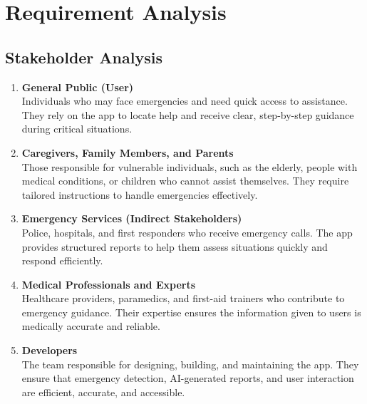 \chapter{Requirement Analysis}
\label{chap:requirement-analysis}

\section{Stakeholder Analysis}
\label{section:stakeholder-analysis}
\begin{enumerate}
    \item \textbf{General Public (User)} \\
    Individuals who may face emergencies and need quick access to assistance. 
    They rely on the app to locate help and receive clear, step-by-step guidance during critical situations.
    \item \textbf{Caregivers, Family Members, and Parents} \\
    Those responsible for vulnerable individuals, such as the elderly, people with medical conditions, or 
    children who cannot assist themselves. They require tailored instructions to handle emergencies effectively.

    \item \textbf{Emergency Services (Indirect Stakeholders)} \\
    Police, hospitals, and first responders who receive emergency calls. 
    The app provides structured reports to help them assess situations quickly and respond efficiently.
    \item \textbf{Medical Professionals and Experts} \\
    Healthcare providers, paramedics, and first-aid trainers who contribute to emergency guidance. Their expertise ensures the information given to users is medically accurate and reliable.
    \item \textbf{Developers} \\
    The team responsible for designing, building, and maintaining the app. They ensure that emergency detection, AI-generated reports, and user interaction are efficient, accurate, and accessible.

\end{enumerate}

